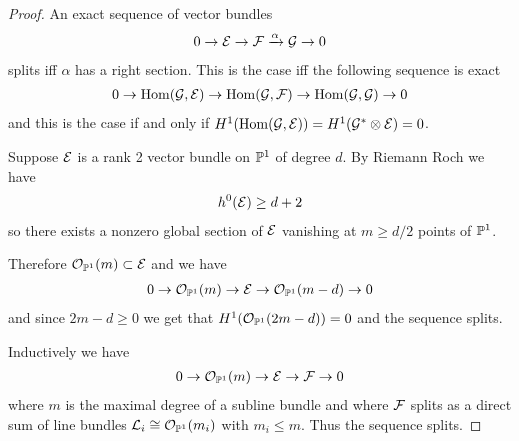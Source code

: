 \documentclass[12pt]{article}
\begin{document}
\begin{proof}
    An exact sequence of vector bundles \begin{align*}
        0 \to \cE \to \cF \xrightarrow{\alpha} \cG \to 0
    \end{align*} splits iff $\alpha$ has a right section. This is the case iff
    the following sequence is exact \begin{align*}
        0 \to \Hom(\cG,\cE) \to \Hom(\cG,\cF) \to \Hom(\cG,\cG) \to 0
    \end{align*}
    and this is the case if and only if $H^1(\Hom(\cG,\cE)) = H^1(\cG^*\otimes \cE) = 0$.

    Suppose $\cE$ is a rank 2 vector bundle on $\P^1$ of degree $d$.
    By Riemann Roch we have \begin{align*}
        h^0(\cE) \geq d + 2
    \end{align*}
    so there exists a nonzero global section of $\cE$ vanishing at $m\geq d/2$ points
    of $\P^1$. 

    Therefore $\cO_{\P^1}(m) \subset \cE$ and we have \begin{align*}
        0 \to \cO_{\P^1}(m) \to \cE \to \cO_{\P^1}(m-d) \to 0
    \end{align*} and since $2m - d\geq 0$ we get that $H^1(\cO_{\P^1}(2m-d)) = 0$
    and the sequence splits.

    Inductively we have \begin{align*}
        0 \to \cO_{\P^1}(m) \to \cE \to \cF \to 0
    \end{align*} where $m$ is the maximal degree
    of a subline bundle and where $\cF$ splits as a direct sum of line bundles $\cL_i
    \cong \cO_{\P^1}(m_i)$ with $m_i \leq m$. Thus the sequence splits.
\end{proof}
\end{document}
